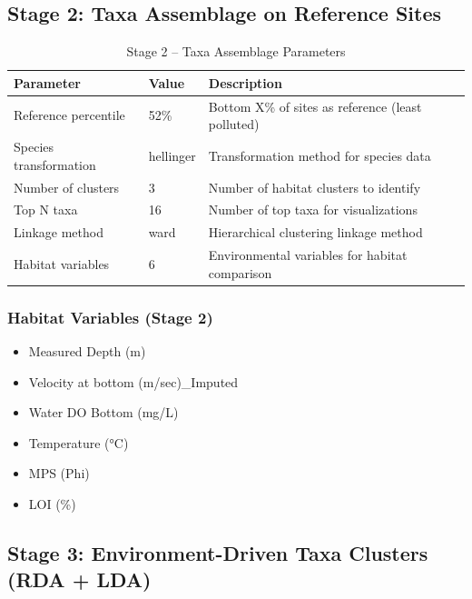 \subsection*{Stage 2: Taxa Assemblage on Reference Sites}

\begin{table}[H]
\centering
\caption{Stage 2 -- Taxa Assemblage Parameters}
\label{tab:stage2_params}
\begin{tabular}{l|l|p{6cm}}
\hline
\textbf{Parameter} & \textbf{Value} & \textbf{Description} \\
\hline
Reference percentile & 52\% & Bottom X\% of sites as reference (least polluted) \\
Species transformation & hellinger & Transformation method for species data \\
Number of clusters & 3 & Number of habitat clusters to identify \\
Top N taxa & 16 & Number of top taxa for visualizations \\
Linkage method & ward & Hierarchical clustering linkage method \\
Habitat variables & 6 & Environmental variables for habitat comparison \\
\hline
\end{tabular}
\end{table}

\subsubsection*{Habitat Variables (Stage 2)}
\begin{itemize}
\item Measured Depth (m)
\item Velocity at bottom (m/sec)\_Imputed
\item Water DO Bottom (mg/L)
\item Temperature (°C)
\item MPS (Phi)
\item LOI (\%)
\end{itemize}

\subsection*{Stage 3: Environment-Driven Taxa Clusters (RDA + LDA)}

